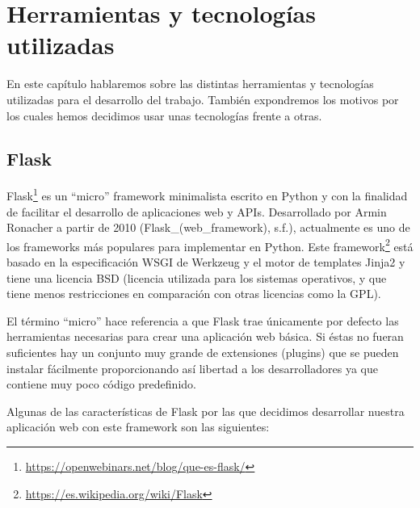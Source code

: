 \chapter{Herramientas y tecnologías utilizadas}
\label{cap:herramientas}


En este capítulo hablaremos sobre las distintas herramientas y tecnologías utilizadas para el desarrollo del trabajo. También expondremos los motivos por los cuales hemos decidimos usar unas tecnologías frente a otras.


\section{Flask}\label{sec:flask}


Flask\footnote{\href{https://openwebinars.net/blog/que-es-flask/}{https://openwebinars.net/blog/que-es-flask/}} es un ``micro'' framework minimalista escrito en Python y con la finalidad de facilitar el desarrollo de aplicaciones web y APIs. Desarrollado por Armin Ronacher a partir de 2010 (Flask\_(web\_framework), s.f.), actualmente es uno de los frameworks más populares para implementar en Python. Este framework\footnote{\href{https://es.wikipedia.org/wiki/Flask}{https://es.wikipedia.org/wiki/Flask}} está basado en la especificación WSGI de Werkzeug y el motor de templates Jinja2 y tiene una licencia BSD (licencia utilizada para los sistemas operativos, y que tiene menos restricciones en comparación con otras licencias como la GPL). 

El término ``micro'' hace referencia a que Flask trae únicamente por defecto las herramientas necesarias para crear una aplicación web básica. Si éstas no fueran suficientes hay un conjunto muy grande de extensiones (plugins) que se pueden instalar fácilmente proporcionando así libertad a los desarrolladores ya que contiene muy poco código predefinido.

Algunas de las características de Flask por las que decidimos desarrollar nuestra aplicación web con este framework son las siguientes:

